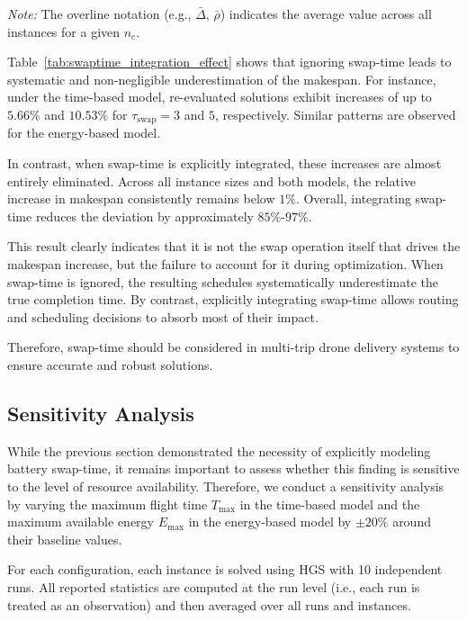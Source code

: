 \documentclass[3p, authoryear, 11pt]{elsarticle}
\begin{document}
\begin{table}[H]
\vspace{1ex} 

    \textit{Note:} The overline notation (e.g., $\bar{\Delta}$, $\bar{\rho}$) indicates the average value across all instances for a given $n_c$.

\end{table}

Table~\ref{tab:swaptime_integration_effect} shows that ignoring swap-time leads to systematic and non-negligible underestimation of the makespan. For instance, under the time-based model, re-evaluated solutions exhibit increases of up to $5.66\%$ and $10.53\%$ for $\tau_{\mathrm{swap}}=3$ and $5$, respectively. Similar patterns are observed for the energy-based model. 

In contrast, when swap-time is explicitly integrated, these increases are almost entirely eliminated. Across all instance sizes and both models, the relative increase in makespan consistently remains below $1\%$. Overall, integrating swap-time reduces the deviation by approximately $85\%$-$97\%$.

This result clearly indicates that it is not the swap operation itself that drives the makespan increase, but the failure to account for it during optimization. When swap-time is ignored, the resulting schedules systematically underestimate the true completion time. By contrast, explicitly integrating swap-time allows routing and scheduling decisions to absorb most of their impact.

Therefore, swap-time should be considered in multi-trip drone delivery systems to ensure accurate and robust solutions.

\subsection{Sensitivity Analysis}
\label{sec:sensitivity_alalysis}

While the previous section demonstrated the necessity of explicitly modeling battery swap-time, it remains important to assess whether this finding is sensitive to the level of resource availability. Therefore, we conduct a sensitivity analysis by varying the maximum flight time $T_{\max}$ in the time-based model and the maximum available energy $E_{\max}$ in the energy-based model by $\pm 20\%$ around their baseline values.

For each configuration, each instance is solved using HGS with 10 independent runs. All reported statistics are computed at the run level (i.e., each run is treated as an observation) and then averaged over all runs and instances. 
\end{document}
